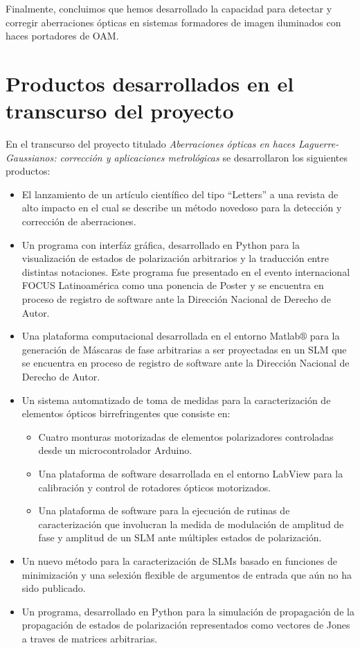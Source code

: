 Finalmente, concluimos que hemos desarrollado la capacidad para
  detectar y corregir aberraciones ópticas en sistemas formadores de imagen
  iluminados con haces portadores de OAM.

\section{Productos desarrollados en el transcurso del proyecto}

En el transcurso del proyecto titulado \textit{Aberraciones ópticas en haces Laguerre-Gaussianos: corrección
  y aplicaciones metrológicas} se desarrollaron los siguientes
productos:

\begin{itemize}
\item El lanzamiento de un artículo científico del tipo ``Letters'' a una revista de alto
  impacto en el cual se describe un método novedoso para la detección y corrección de aberraciones. 
\item Un programa con interfáz gráfica, desarrollado en Python para la
  visualización de estados de polarización arbitrarios y la traducción entre distintas
  notaciones. Este programa fue presentado en el evento internacional
  FOCUS Latinoamérica como una ponencia de Poster y se encuentra en proceso de registro de
  software ante la Dirección Nacional de Derecho de Autor. 
\item Una plataforma computacional desarrollada en el entorno
  Matlab$\circledR$ para la generación de Máscaras de fase arbitrarias
  a ser proyectadas en un SLM que se encuentra en proceso de registro
  de software ante la Dirección Nacional de Derecho de Autor. 
\item Un sistema automatizado de toma de medidas para la
  caracterización de elementos ópticos birrefringentes que consiste
  en:
  \begin{itemize}
  \item  Cuatro monturas motorizadas de elementos polarizadores
    controladas desde un microcontrolador Arduino.
   \item Una plataforma de software desarrollada en el entorno LabView
     para la calibración y control de rotadores ópticos motorizados.
   \item Una plataforma de software para la ejecución de rutinas de
     caracterización que involucran la medida de modulación de amplitud de fase
     y amplitud de un SLM ante múltiples estados de polarización.
  \end{itemize}
\item Un nuevo método para la caracterización de SLMs basado en
  funciones de minimización y una selexión flexible de argumentos de
  entrada que aún no ha sido publicado.
\item Un programa, desarrollado en Python para la
  simulación de propagación de la propagación de estados de
  polarización representados como vectores de Jones a traves de
  matrices arbitrarias.  
\end{itemize}



